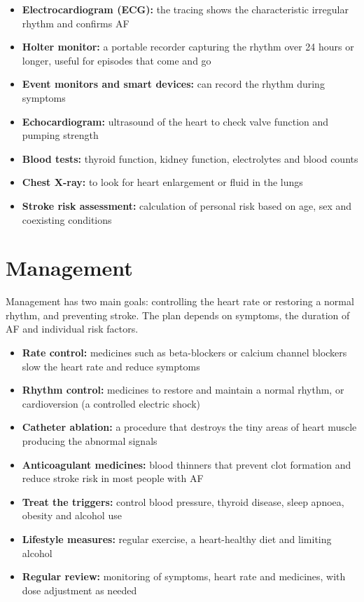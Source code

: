 \begin{itemize}
    \item \textbf{Electrocardiogram (ECG):} the tracing shows the characteristic irregular rhythm and confirms AF
    \item \textbf{Holter monitor:} a portable recorder capturing the rhythm over 24 hours or longer, useful for episodes that come and go
    \item \textbf{Event monitors and smart devices:} can record the rhythm during symptoms
    \item \textbf{Echocardiogram:} ultrasound of the heart to check valve function and pumping strength
    \item \textbf{Blood tests:} thyroid function, kidney function, electrolytes and blood counts
    \item \textbf{Chest X-ray:} to look for heart enlargement or fluid in the lungs
    \item \textbf{Stroke risk assessment:} calculation of personal risk based on age, sex and coexisting conditions
\end{itemize}

\section*{Management}
Management has two main goals: controlling the heart rate or restoring a normal rhythm, and preventing stroke. The plan depends on symptoms, the duration of AF and individual risk factors.

\begin{itemize}
    \item \textbf{Rate control:} medicines such as beta-blockers or calcium channel blockers slow the heart rate and reduce symptoms
    \item \textbf{Rhythm control:} medicines to restore and maintain a normal rhythm, or cardioversion (a controlled electric shock)
    \item \textbf{Catheter ablation:} a procedure that destroys the tiny areas of heart muscle producing the abnormal signals
    \item \textbf{Anticoagulant medicines:} blood thinners that prevent clot formation and reduce stroke risk in most people with AF
    \item \textbf{Treat the triggers:} control blood pressure, thyroid disease, sleep apnoea, obesity and alcohol use
    \item \textbf{Lifestyle measures:} regular exercise, a heart-healthy diet and limiting alcohol
    \item \textbf{Regular review:} monitoring of symptoms, heart rate and medicines, with dose adjustment as needed
\end{itemize}

